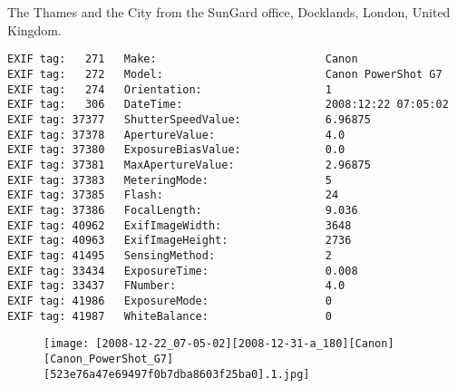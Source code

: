 \section{\protect{}}
\noindent The Thames and the City from the SunGard office, Docklands, London, United Kingdom.
\noindent
\begin{lstlisting}
EXIF tag:   271   Make:                          Canon
EXIF tag:   272   Model:                         Canon PowerShot G7
EXIF tag:   274   Orientation:                   1
EXIF tag:   306   DateTime:                      2008:12:22 07:05:02
EXIF tag: 37377   ShutterSpeedValue:             6.96875
EXIF tag: 37378   ApertureValue:                 4.0
EXIF tag: 37380   ExposureBiasValue:             0.0
EXIF tag: 37381   MaxApertureValue:              2.96875
EXIF tag: 37383   MeteringMode:                  5
EXIF tag: 37385   Flash:                         24
EXIF tag: 37386   FocalLength:                   9.036
EXIF tag: 40962   ExifImageWidth:                3648
EXIF tag: 40963   ExifImageHeight:               2736
EXIF tag: 41495   SensingMethod:                 2
EXIF tag: 33434   ExposureTime:                  0.008
EXIF tag: 33437   FNumber:                       4.0
EXIF tag: 41986   ExposureMode:                  0
EXIF tag: 41987   WhiteBalance:                  0

\end{lstlisting}
\clearpage
\begin{figure}
\raggedleft
\texttt{[image: [2008-12-22\_07-05-02][2008-12-31-a\_180][Canon][Canon\_PowerShot\_G7][523e76a47e69497f0b7dba8603f25ba0].1.jpg]}
\end{figure}


\clearpage
